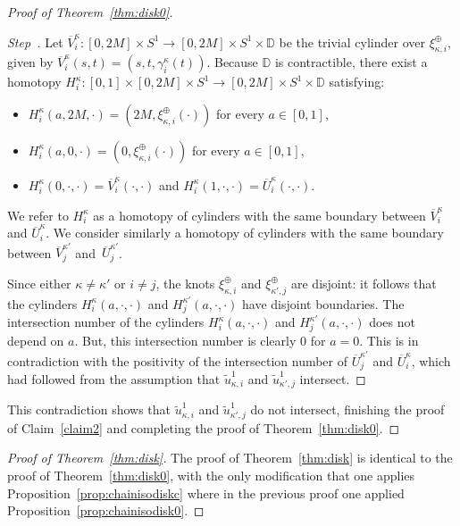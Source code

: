 \documentclass[AHL,Unicode,longabstracts,published]{cedram}
\newcommand{\D}{\mathbb{D}}
\newcounter{claim}
\newcounter{stepcount}
\newenvironment{step}{\refstepcounter{stepcount}\begin{proof}[Step~\thestepcount]}{\let\qed\relax\end{proof}}
\begin{document}
\begin{proof}[Proof of Theorem~\ref{thm:disk0}]
\begin{step}
Let $\overline{V}^\kappa_i: [0,2M] \times S^1 \to [0,2M] \times S^1 \times \D$ be the trivial cylinder over $\xi^\oplus_{\kappa,i}$, given by $\overline{V}^\kappa_i(s,t)= (s,t,\gamma^\kappa_i(t))$. Because $\D$ is contractible, there exist a homotopy $H^\kappa_i: [0,1] \times [0,2M] \times S^1 \to [0,2M] \times S^1 \times \D $ satisfying:
\begin{itemize}
\item $H^\kappa_i(a,2M,\cdot) = (2M, \xi^\oplus_{\kappa,i}(\cdot))$ for every $a\in [0,1]$,
\item $H^\kappa_i(a,0,\cdot) = (0,\xi^\oplus_{\kappa,i}(\cdot))$ for every $a\in [0,1]$,
\item $H^\kappa_i(0,\cdot,\cdot) = \overline{V}^\kappa_i(\cdot,\cdot)$ and $H^\kappa_i(1,\cdot,\cdot)= \overline{U}^\kappa_i(\cdot,\cdot)$.
\end{itemize}
We refer to $H^\kappa_i$ as a homotopy of cylinders with the same boundary between $\overline{V}^\kappa_i$ and $\overline{U}^\kappa_i$. We consider similarly a homotopy of cylinders with the same boundary between $\overline{V}^{\kappa'}_j$ and~$\overline{U}^{\kappa'}_j$.

Since either $\kappa \neq \kappa'$ or $i \neq j$, the knots $\xi^\oplus_{\kappa,i}$ and $\xi^\oplus_{\kappa',j}$ are disjoint: it follows that the cylinders $H^\kappa_i(a,\cdot,\cdot)$ and $H^{\kappa'}_j(a,\cdot,\cdot)$ have disjoint boundaries. The intersection number of the cylinders $H^\kappa_i(a,\cdot,\cdot)$ and $H^{\kappa'}_j(a,\cdot,\cdot)$ does not depend on $a$. But, this intersection number is clearly $0$ for $a=0$. This is in contradiction with the positivity of the intersection number of $\overline{U}^{\kappa'}_j$ and $\overline{U}^\kappa_i$, which had followed from the assumption that $\widetilde{u}^1_{\kappa,i}$ and $\widetilde{u}^1_{\kappa',j}$ intersect.
\end{step}
This contradiction shows that $\widetilde{u}^1_{\kappa,i}$ and $\widetilde{u}^1_{\kappa',j}$ do not intersect, finishing the proof of Claim~\ref{claim2} and completing the proof of Theorem~\ref{thm:disk0}.
\end{proof}



\begin{proof}[Proof of Theorem~\ref{thm:disk}]
The proof of Theorem~\ref{thm:disk} is identical to the proof of Theorem~\ref{thm:disk0}, with the only modification that one applies Proposition~\ref{prop:chainisodiskc} where in the previous proof one applied Proposition~\ref{prop:chainisodisk0}.
\end{proof}
\end{document}
